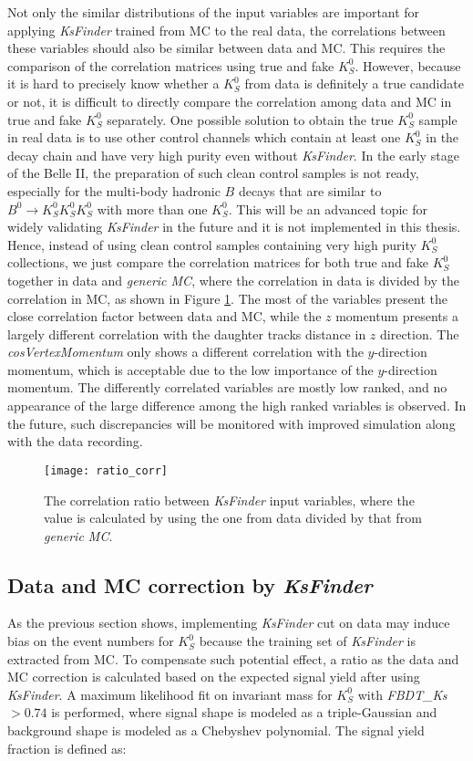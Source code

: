 Not only the similar distributions of the input variables are important for applying \textit{KsFinder} trained from MC to the real data, the correlations between these variables should also be similar between data and MC. This requires the comparison of the correlation matrices using true and fake $K_S^0$. However, because it is hard to precisely know whether a $K_S^0$ from data is definitely a true candidate or not, it is difficult to directly compare the correlation among data and MC in true and fake $K_S^0$ separately. One possible solution to obtain the true $K_S^0$ sample in real data is to use other control channels which contain at least one $K_S^0$ in the decay chain and have very high purity even without \textit{KsFinder}. In the early stage of the Belle II, the preparation of such clean control samples is not ready, especially for the multi-body hadronic $B$ decays that are similar to $B^0 \to K_S^0  K_S^0  K_S^0$ with more than one $K_S^0$. This will be an advanced topic for widely validating \textit{KsFinder} in the future and it is not implemented in this thesis.
Hence, instead of using clean control samples containing very high purity $K_S^0$ collections, we just compare the correlation matrices for both true and fake $K_S^0$ together in data and \textit{generic MC}, where the correlation in data is divided by the correlation in MC, as shown in Figure \ref{fig:ratio_corr}. The most of the variables present the close correlation factor between data and MC, while the $z$ momentum presents a largely different correlation with the daughter tracks distance in $z$ direction. The \textit{cosVertexMomentum} only shows a different correlation with the $y$-direction momentum, which is acceptable due to the low importance of the $y$-direction momentum.  The differently correlated variables are mostly low ranked, and no appearance of the large difference among the high ranked variables is observed. In the future, such discrepancies will be monitored with improved simulation along with the data recording.
\begin{figure}[htpb]
		\centering 
		\texttt{[image: ratio\_corr]}
	\caption{The correlation ratio between \textit{KsFinder} input variables, where the value is calculated by using the one from data divided by that from \textit{generic MC}.}
	\label{fig:ratio_corr}
\end{figure}


\subsection{Data and MC correction by \textit{KsFinder}}
As the previous section shows, implementing \textit{KsFinder} cut on data may induce bias on the event numbers for $K_S^0$ because the training set of \textit{KsFinder} is extracted from MC. To compensate such potential effect, a ratio as the data and MC correction is calculated based on the expected signal yield after using \textit{KsFinder}. A maximum likelihood fit on invariant mass for $K_S^0$ with \textit{FBDT\_Ks} $>0.74$ is performed, where signal shape is modeled as a triple-Gaussian and background shape is modeled as a Chebyshev polynomial. The signal yield fraction is defined as:

